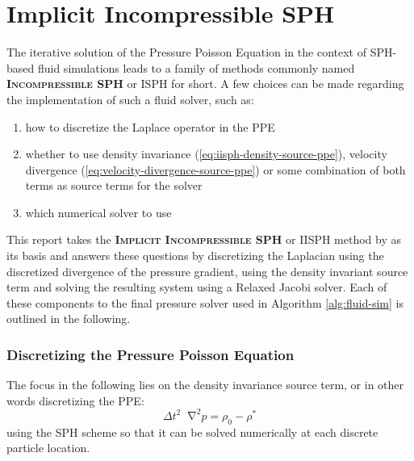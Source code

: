 \documentclass[oneside, a4paper]{book}
\newcommand\emphasis[1]{{\scshape\bfseries#1}}
\newcommand*\Laplace{\mathop{}\!\mathbin\nabla^2}
\begin{document}
    \section{Implicit Incompressible SPH}
    The iterative solution of the Pressure Poisson Equation in the context of SPH-based fluid simulations leads to a family of methods commonly named \emphasis{Incompressible SPH} or ISPH for short. A few choices can be made regarding the implementation of such a fluid solver, such as:
    \begin{enumerate}
      \item how to discretize the Laplace operator in the PPE \autocite{fuerstenau-laplace-discretization-comparison}
      \item whether to use density invariance (\autoref{eq:iisph-density-source-ppe})\autocite{iisph}, velocity divergence (\autoref{eq:velocity-divergence-source-ppe}) or some combination of both terms \autocites{dfsph}{optimized-source-term} as source terms for the solver
      \item which numerical solver to use
    \end{enumerate}

    This report takes the \emphasis{Implicit Incompressible SPH} or IISPH method by \autocite[Ihmsen et al.]{iisph} as its basis and answers these questions by discretizing the Laplacian using the discretized divergence of the pressure gradient, using the density invariant source term and solving the resulting system using a Relaxed Jacobi solver. Each of these components to the final pressure solver used in Algorithm \ref{alg:fluid-sim} is outlined in the following.
    
    \subsubsection{Discretizing the Pressure Poisson Equation}
    The focus in the following lies on the density invariance source term, or in other words discretizing the PPE:
    \begin{equation}
      \Delta t^2 \Laplace p = \rho_0-\rho^*
    \end{equation}
    using the SPH scheme so that it can be solved numerically at each discrete particle location.
\end{document}
